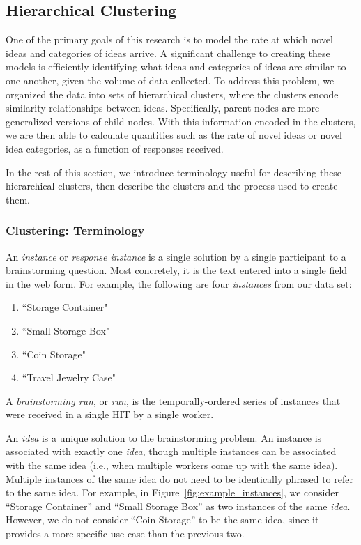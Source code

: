 \subsection{Hierarchical Clustering}
One of the primary goals of this research is to model the rate at which novel ideas and categories of ideas arrive. A significant challenge to creating these models is efficiently identifying what ideas and categories of ideas are similar to one another, given the volume of data collected. To address this problem, we organized the data into sets of hierarchical clusters, where the clusters encode similarity relationships between ideas. Specifically, parent nodes are more generalized versions of child nodes. With this information encoded in the clusters, we are then able to calculate quantities such as the rate of novel ideas or novel idea categories, as a function of responses received. 

In the rest of this section, we introduce terminology useful for describing these hierarchical clusters, then describe the clusters and the process used to create them.

\subsubsection{Clustering: Terminology}
An \emph{instance} or \emph{response instance} is a single solution by a single participant to a brainstorming question. Most concretely, it is the text entered into a single field in the web form. For example, the following are four \emph{instances} from our data set:

\begin{enumerate}
    \item ``Storage Container"
    \item ``Small Storage Box"
    \item ``Coin Storage"
    \item ``Travel Jewelry Case"
\end{enumerate}

A \emph{brainstorming run}, or \emph{run}, is the temporally-ordered series of instances that were received in a single HIT by a single worker.

An \emph{idea} is a unique solution to the brainstorming problem. An instance is associated with exactly one \emph{idea}, though multiple instances can be associated with the same idea (i.e., when multiple workers come up with the same idea). Multiple instances of the same idea do not need to be identically phrased to refer to the same idea. For example, in Figure~\ref{fig:example_instances}, we consider ``Storage Container'' and ``Small Storage Box'' as two instances of the same \emph{idea}. However, we do not consider ``Coin Storage'' to be the same idea, since it provides a more specific use case than the previous two.

